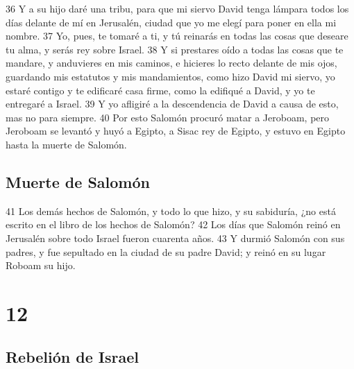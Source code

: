 36 Y a su hijo daré una tribu, para que mi siervo David tenga lámpara todos los días delante de mí en Jerusalén, ciudad que yo me elegí para poner en ella mi nombre.
37 Yo, pues, te tomaré a ti, y tú reinarás en todas las cosas que deseare tu alma, y serás rey sobre Israel.
38 Y si prestares oído a todas las cosas que te mandare, y anduvieres en mis caminos, e hicieres lo recto delante de mis ojos, guardando mis estatutos y mis mandamientos, como hizo David mi siervo, yo estaré contigo y te edificaré casa firme, como la edifiqué a David, y yo te entregaré a Israel.
39 Y yo afligiré a la descendencia de David a causa de esto, mas no para siempre.
40 Por esto Salomón procuró matar a Jeroboam, pero Jeroboam se levantó y huyó a Egipto, a Sisac rey de Egipto, y estuvo en Egipto hasta la muerte de Salomón.
\section*{Muerte de Salomón}

 
41 Los demás hechos de Salomón, y todo lo que hizo, y su sabiduría, ¿no está escrito en el libro de los hechos de Salomón?
42 Los días que Salomón reinó en Jerusalén sobre todo Israel fueron cuarenta años.
43 Y durmió Salomón con sus padres, y fue sepultado en la ciudad de su padre David; y reinó en su lugar Roboam su hijo.

\chapter{12}

\section*{Rebelión de Israel}

 

